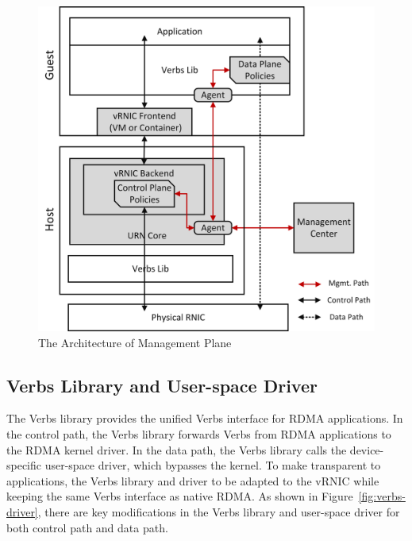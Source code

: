 \begin{figure}[!ht]
	\centering
	\includegraphics[width=1\linewidth]{images/mgmt-center.png}
	\caption{The Architecture of \sys Management Plane}
	\label{fig:mgmt-center}
\end{figure}

\subsection{Verbs Library and User-space Driver}


The Verbs library provides the unified Verbs interface for RDMA applications. In the control path, the Verbs library forwards Verbs from RDMA applications to the RDMA kernel driver. In the data path, the Verbs library calls the device-specific user-space driver, which bypasses the kernel. To make \sys transparent to applications, the Verbs library and driver to be adapted to the vRNIC while keeping the same Verbs interface as native RDMA. As shown in Figure~\ref{fig:verbs-driver}, there are key modifications in the Verbs library and user-space driver for both control path and data path.

